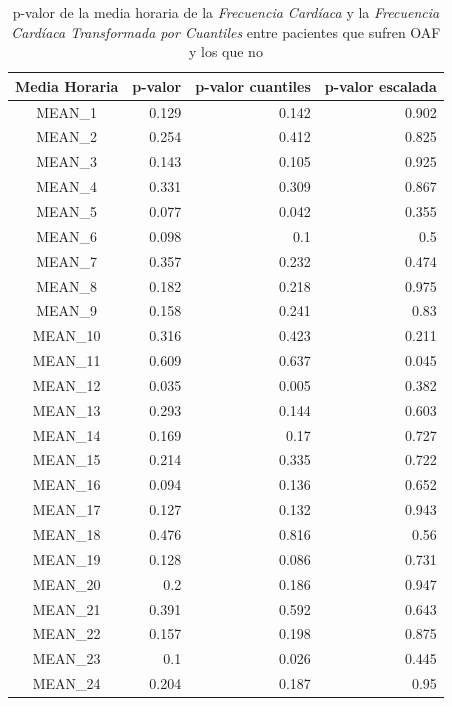 \begin{table}[H]
    \centering
    \begin{tabular}{|c|r|r|r|}
        \hline
        \textbf{Media Horaria} & \textbf{p-valor} & \textbf{p-valor 
        cuantiles} & \textbf{p-valor 
        escalada} \\
        \hline
        MEAN\_1 & 0.129 & 0.142 & 0.902 \\
        MEAN\_2 & 0.254 & 0.412 & 0.825 \\
        MEAN\_3 & 0.143 & 0.105 & 0.925 \\
        MEAN\_4 & 0.331 & 0.309 & 0.867 \\
        MEAN\_5 & 0.077 & 0.042 & 0.355 \\
        MEAN\_6 & 0.098 & 0.1 & 0.5 \\
        MEAN\_7 & 0.357 & 0.232 & 0.474 \\
        MEAN\_8 & 0.182 & 0.218 & 0.975 \\
        MEAN\_9 & 0.158 & 0.241 & 0.83 \\
        MEAN\_10 & 0.316 & 0.423 & 0.211 \\
        MEAN\_11 & 0.609 & 0.637 & 0.045 \\
        MEAN\_12 & 0.035 & 0.005 & 0.382 \\
        MEAN\_13 & 0.293 & 0.144 & 0.603 \\
        MEAN\_14 & 0.169 & 0.17 & 0.727 \\
        MEAN\_15 & 0.214 & 0.335 & 0.722 \\
        MEAN\_16 & 0.094 & 0.136 & 0.652 \\
        MEAN\_17 & 0.127 & 0.132 & 0.943 \\
        MEAN\_18 & 0.476 & 0.816 & 0.56 \\
        MEAN\_19 & 0.128 & 0.086 & 0.731 \\
        MEAN\_20 & 0.2 & 0.186 & 0.947 \\
        MEAN\_21 & 0.391 & 0.592 & 0.643 \\
        MEAN\_22 & 0.157 & 0.198 & 0.875 \\
        MEAN\_23 & 0.1 & 0.026 & 0.445 \\
        MEAN\_24 & 0.204 & 0.187 & 0.95 \\
        \hline
    \end{tabular}
    \caption{p-valor de la media horaria de la \textit{Frecuencia Cardíaca} y la \textit{Frecuencia Cardíaca Transformada por Cuantiles} entre pacientes que sufren OAF y los que no}\label{tab:mean-FC}
\end{table}

